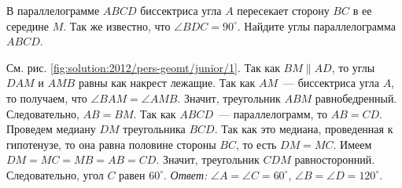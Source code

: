 В параллелограмме $ABCD$ биссектриса угла $A$ пересекает сторону $BC$ в ее
середине $M$.
Так же известно, что $\angle BDC = 90^\circ$.
Найдите углы параллелограмма $ABCD$.

%
\label{solution:2012/pers-geomt/junior/1}%
См. рис. \ref{fig:solution:2012/pers-geomt/junior/1}.
Так как $BM \parallel AD$, то углы $DAM$ и $AMB$ равны как накрест лежащие.
Так как $AM$~--- биссектриса угла $A$, то получаем, что
$\angle BAM = \angle AMB$.
Значит, треугольник $ABM$ равнобедренный.
Следовательно, $AB = BM$.
Так как $ABCD$~--- параллелограмм, то $AB = CD$.
Проведем медиану $DM$ треугольника $BCD$.
Так как это медиана, проведенная к гипотенузе, то она равна половине стороны
$BC$, то есть $DM = MC$.
Имеем $DM = MC = MB = AB = CD$.
Значит, треугольник $CDM$ равносторонний.
Следовательно, угол $C$ равен $60^\circ$.
\emph{Ответ:}
$\angle A = \angle C = 60^\circ$,
$\angle B = \angle D = 120^\circ$.

